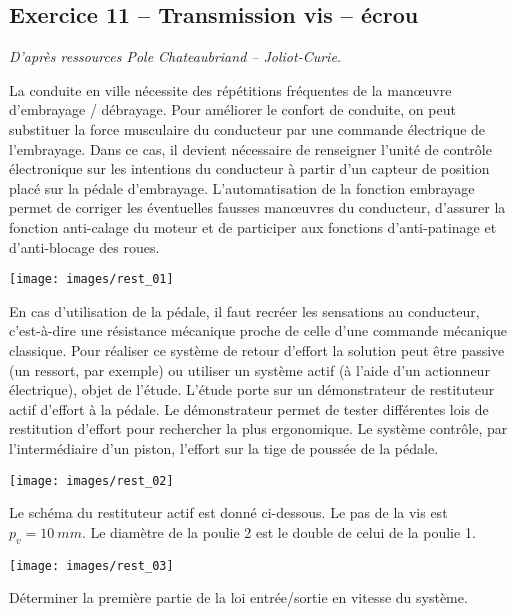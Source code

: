 \documentclass[10pt,fleqn]{article} %
\begin{document}
\begin{multicols}{2}
\begin{multicols}{2}
\section*{Exercice 11 -- Transmission vis -- écrou}
\textit{D'après ressources Pole Chateaubriand -- Joliot-Curie.}
\setcounter{exo}{0}

\ifprof
\else

La conduite en ville nécessite des répétitions
fréquentes de la manœuvre d’embrayage /
débrayage. Pour améliorer le confort de conduite,
on peut substituer la force musculaire du
conducteur par une commande électrique de
l’embrayage. Dans ce cas, il devient nécessaire de
renseigner l’unité de contrôle électronique sur les
intentions du conducteur à partir d’un capteur de
position placé sur la pédale d’embrayage.
L’automatisation de la fonction embrayage
permet de corriger les éventuelles fausses
manœuvres du conducteur, d’assurer la fonction
anti-calage du moteur et de participer aux
fonctions d’anti-patinage et d’anti-blocage des
roues.

\begin{center}
\texttt{[image: images/rest\_01]}
\end{center}


En cas d’utilisation de la pédale, il faut recréer les sensations
au conducteur, c'est-à-dire une résistance mécanique proche
de celle d’une commande mécanique classique. Pour réaliser
ce système de retour d’effort la solution peut être passive (un
ressort, par exemple) ou utiliser un système actif (à l’aide d’un
actionneur électrique), objet de l’étude.
L’étude porte sur un démonstrateur de restituteur actif
d’effort à la pédale. Le démonstrateur permet de tester
différentes lois de restitution d’effort pour rechercher la plus
ergonomique. Le système contrôle, par l’intermédiaire d’un
piston, l’effort sur la tige de poussée de la pédale.


\begin{center}
\texttt{[image: images/rest\_02]}
\end{center}

Le schéma du restituteur actif est donné ci-dessous. Le pas de la vis est $p_v =\SI{10}{mm}$.
Le diamètre de la poulie 2 est le double de celui de la poulie 1. 


\begin{center}
\texttt{[image: images/rest\_03]}
\end{center}
\fi
\begin{obj}
Déterminer la première partie
de la loi entrée/sortie en vitesse du
système.
\end{obj}


\end{multicols}
\end{multicols}
\end{document}

